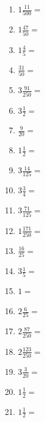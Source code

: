 \documentclass[12pt]{article}
\begin{document}
\begin{enumerate}
\item \large $ 1 \frac{11}{500} = $ \vspace{1.5cm}
\item \large $ 1 \frac{47}{50} = $ \vspace{1.5cm}
\item \large $ 1 \frac{4}{5} = $ \vspace{1.5cm}
\item \large $ \frac{31}{50} = $ \vspace{1.5cm}
\item \large $ 3 \frac{91}{250} = $ \vspace{1.5cm}
\item \large $ 3 \frac{1}{2} = $ \vspace{1.5cm}
\newpage
\item \large $ \frac{9}{20} = $ \vspace{1.5cm}
\item \large $ 1 \frac{1}{2} = $ \vspace{1.5cm}
\item \large $ 3 \frac{14}{125} = $ \vspace{1.5cm}
\item \large $ 3 \frac{3}{4} = $ \vspace{1.5cm}
\item \large $ 3 \frac{71}{125} = $ \vspace{1.5cm}
\item \large $ 1 \frac{171}{250} = $ \vspace{1.5cm}
\item \large $ \frac{16}{25} = $ \vspace{1.5cm}
\item \large $ 3 \frac{1}{5} = $ \vspace{1.5cm}
\item \large $ 1 = $ \vspace{1.5cm}
\item \large $ 2 \frac{6}{25} = $ \vspace{1.5cm}
\newpage
\item \large $ 2 \frac{87}{250} = $ \vspace{1.5cm}
\item \large $ 2 \frac{123}{250} = $ \vspace{1.5cm}
\item \large $ 3 \frac{3}{20} = $ \vspace{1.5cm}
\item \large $ 1 \frac{1}{2} = $ \vspace{1.5cm}
\item \large $ 1 \frac{1}{2} = $ \vspace{1.5cm}

\end{enumerate}
\end{document}
